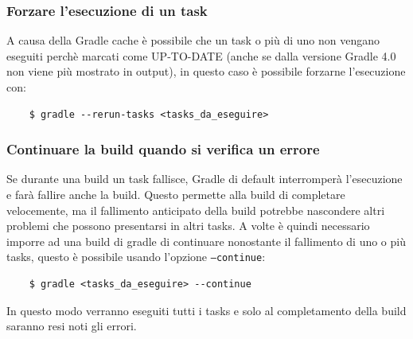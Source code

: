 \subsubsection{Forzare l'esecuzione di un task} 
A causa della Gradle cache è possibile che un task o più di uno non vengano eseguiti perchè marcati come UP-TO-DATE (anche se dalla versione Gradle 4.0 non viene più mostrato in output), in questo caso è possibile forzarne l'esecuzione con:
\begin{verbatim}
    $ gradle --rerun-tasks <tasks_da_eseguire> \end{verbatim}
    
\subsubsection{Continuare la build quando si verifica un errore}
Se durante una build un task fallisce, Gradle di default interromperà l'esecuzione e farà fallire anche la build. Questo permette alla build di completare velocemente, ma il fallimento anticipato della build potrebbe nascondere altri problemi che possono presentarsi in altri tasks. A volte è quindi necessario imporre ad una build di gradle di continuare nonostante il fallimento di uno o più tasks, questo è possibile usando l'opzione \texttt{--continue}:
\begin{verbatim}
    $ gradle <tasks_da_eseguire> --continue\end{verbatim}
In questo modo verranno eseguiti tutti i tasks e solo al completamento della build saranno resi noti gli errori.

